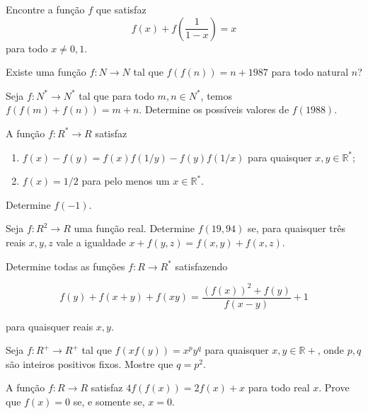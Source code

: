\begin{questao}
  Encontre a função $f$ que satisfaz
  $$ f(x) + f \left( \frac{1}{1-x} \right) = x $$ para todo $x \not = 0,1$.
\end{questao}

\begin{questao}
  Existe uma função $f:N \rightarrow N$ tal que $f(f(n)) = n + 1987$ para todo
  natural $n$?
\end{questao}

\begin{questao}
  Seja $f: N^{*} \rightarrow N^{*}$ tal que para todo $m,n \in N^{*}$, temos
  $f(f(m)+f(n)) = m+n$. Determine os possíveis valores de $f(1988)$.
\end{questao}

\begin{questao}
  A função $f: R^* \rightarrow R$ satisfaz

  \begin{enumerate}

  \item $f(x)-f(y) = f(x)f(1/y)-f(y)f(1/x)$ para quaisquer $x,y \in
    \mathbb{R^*}$;

  \item $f(x)=1/2$ para pelo menos um $x \in \mathbb{R^*}$.
  \end{enumerate}

  Determine $f(-1)$.
\end{questao}

\begin{questao}
  Seja $f: R^2 \rightarrow R$ uma função real. Determine $f(19,94)$ se, para
  quaisquer três reais $x,y,z$ vale a igualdade $x+f(y,z) = f(x,y)+f(x,z)$.
\end{questao}

\begin{questao}
  Determine todas as funções $f: R \rightarrow R^*$ satisfazendo

  $$ f(y)+f(x+y)+f(xy) = \frac{(f(x))^2+f(y)}{f(x-y)} + 1 $$

  para quaisquer reais $x,y$.
\end{questao}

\begin{questao}
  Seja $f: R^+ \rightarrow R^+$ tal que $f(xf(y)) = x^py^q$ para quaisquer $x,y
  \in \mathbb{R+}$, onde $p,q$ são inteiros positivos fixos. Mostre que $q=p^2$.
\end{questao}

\begin{questao}
  A função $f: R \rightarrow R$ satisfaz $4f(f(x)) = 2f(x)+x$ para todo real
  $x$. Prove que $f(x)=0$ se, e somente se, $x=0$.
\end{questao}


